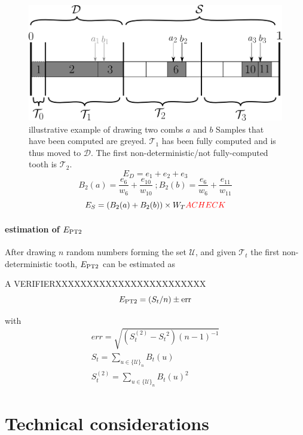 \documentclass[./thesis.tex]{subfiles}
\begin{document}
 \begin{figure}[h!]
	\begin{center}
		\includegraphics[width=0.9\columnwidth]{figures/pt2/toothindet}
	\end{center}
		\caption{illustrative example of drawing two combs $a$ and $b$
		Samples that have been computed are greyed. $\mathcal{T}_1$ has been fully computed and is thus moved to $\mathcal{D}$. The first non-deterministic/not fully-computed tooth is $\mathcal{T}_2$.
		$$E_D = e_1 + e_2 + e_3$$
		$$B_2(a) = \frac{e_6}{w_6} + \frac{e_{10}}{w_{10}}\;;B_2(b) = \frac{e_6}{w_6} + \frac{e_{11}}{w_{11}}$$
		$$E_S = (B_2(a)+B_2(b)) \times W_T \textcolor{red}{A CHECK}$$}
		\label{fig:toothindet}
\end{figure}

\paragraph{estimation of $E_\text{PT2}$}

After drawing $n$ random numbers forming the set $\mathcal{U}$, and given $\mathcal{T}_t$ the first non-deterministic tooth, $E_\text{PT2}$ can be estimated as 

\alert{A VERIFIERXXXXXXXXXXXXXXXXXXXXXXXX}
\begin{equation}
E_\text{PT2} = (S_{t} / n) \pm \text{err}
\end{equation}

with
\begin{align}
err = \sqrt{(S_{t}^{(2)} - {S_{t}}^2) (n-1)^{-1} } \\
S_{t} = \sum_{u \in \{\mathcal{U}\}_n} B_{t}(u) \\
S^{(2)}_{t} = \sum_{u \in \{\mathcal{U}\}_n} B_{t}(u)^2
\end{align}

\clearpage



\section{Technical considerations}
\end{document}

